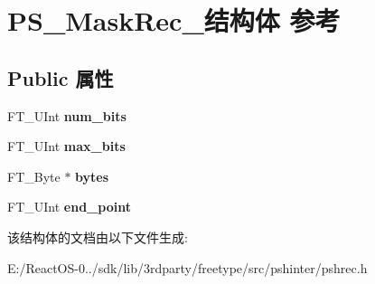 \hypertarget{struct_p_s___mask_rec__}{}\section{P\+S\+\_\+\+Mask\+Rec\+\_\+结构体 参考}
\label{struct_p_s___mask_rec__}
\subsection*{Public 属性}
\begin{DoxyCompactItemize}
\item 
\mbox{\label{struct_p_s___mask_rec___aaa6067e8b00aab3959c00ed4822b78df}} 
F\+T\+\_\+\+U\+Int {\bfseries num\+\_\+bits}
\item 
\mbox{\label{struct_p_s___mask_rec___a53e3d96ef77393a7c1bf789f3e242b08}} 
F\+T\+\_\+\+U\+Int {\bfseries max\+\_\+bits}
\item 
\mbox{\label{struct_p_s___mask_rec___af9cf1260cc7fa966da92a7837a09e75f}} 
F\+T\+\_\+\+Byte $\ast$ {\bfseries bytes}
\item 
\mbox{\label{struct_p_s___mask_rec___a521beb50ceb5c7125ecd3ecccad918b0}} 
F\+T\+\_\+\+U\+Int {\bfseries end\+\_\+point}
\end{DoxyCompactItemize}


该结构体的文档由以下文件生成\+:\begin{DoxyCompactItemize}
\item 
E\+:/\+React\+O\+S-\/0../sdk/lib/3rdparty/freetype/src/pshinter/pshrec.\+h\end{DoxyCompactItemize}
